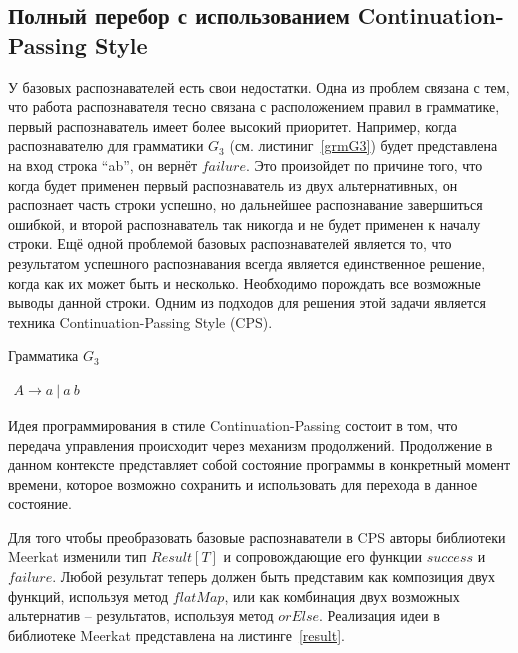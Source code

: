 \subsection{Полный перебор с использованием Continuation-Passing Style}
У базовых распознавателей есть свои недостатки. Одна из проблем связана с тем, что работа распознавателя тесно связана с расположением правил в грамматике, первый распознаватель имеет более высокий приоритет. Например, когда распознавателю для грамматики $G_3$ (см. листиниг~\ref{grmG3}) будет представлена на вход строка “ab”, он вернёт $failure$. Это произойдет по причине того, что когда будет применен первый распознаватель из двух альтернативных, он распознает часть строки успешно, но дальнейшее распознавание завершиться ошибкой, и второй распознаватель так никогда и не будет применен к началу строки. Ещё одной проблемой базовых распознавателей является то, что результатом успешного распознавания всегда является единственное решение, когда как их может быть и несколько. Необходимо порождать все возможные выводы данной строки. Одним из подходов для решения этой задачи является техника Continuation-Passing
Style (CPS).

\begin{listing}
\caption{Грамматика $G_3$}
\label{grmG3}
\centering
$\begin{array}{rl}
A \rightarrow a \ | \ a \ b
\end{array}$
 \end{listing}

 Идея программирования в стиле Continuation-Passing состоит в том, что передача управления происходит через механизм продолжений.
Продолжение в данном контексте представляет собой состояние программы в конкретный момент времени, которое возможно сохранить и использовать для перехода в данное состояние.

Для того чтобы преобразовать базовые распознаватели в CPS авторы библиотеки Meerkat изменили тип $Result[T]$ и сопровождающие его функции $success$ и $failure$. Любой результат теперь должен быть представим как композиция двух функций, используя метод $flatMap$, или как комбинация двух возможных альтернатив – результатов, используя метод $orElse$. Реализация идеи в библиотеке Meerkat представлена на  листинге~\ref{result}.

